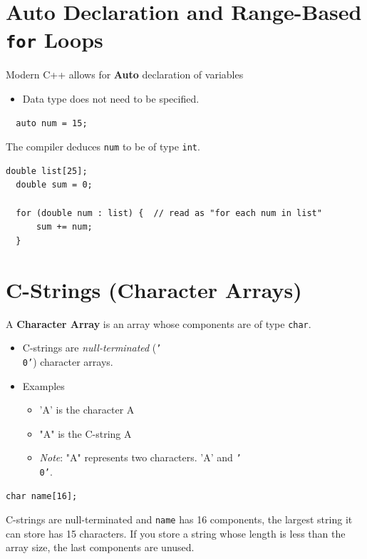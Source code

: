 \documentclass{article}
\begin{document}
\section{Auto Declaration and Range-Based \texttt{for} Loops}
Modern C++ allows for \textbf{Auto} declaration of variables
\begin{itemize}
  \item Data type does not need to be specified.
\end{itemize}

\begin{lstlisting}
  auto num = 15;
\end{lstlisting}

The compiler deduces \texttt{num} to be of type \texttt{int}.

\begin{lstlisting}[caption={Range-Based \texttt{for} Loop}]
  double list[25];
  double sum = 0;

  for (double num : list) {  // read as "for each num in list"
      sum += num;
  }
\end{lstlisting}

\section{C-Strings (Character Arrays)}
A \textbf{Character Array} is an array whose components are of type
\texttt{char}.

\begin{itemize}
  \item C-strings are \textit{null-terminated} (\texttt{'\\0'}) character arrays.
  \item Examples
    \begin{itemize}
      \item 'A' is the character A
      \item "A" is the C-string A
      \item \textit{Note}: "A" represents two characters. 'A' and \texttt{'\\0'}.
    \end{itemize}
\end{itemize}

\begin{lstlisting}[caption={C-String Declaration}]
  char name[16];
\end{lstlisting}

C-strings are null-terminated and \texttt{name} has 16 components, the largest
string it can store has 15 characters. If you store a string whose length is
less than the array size, the last components are unused.
\end{document}
